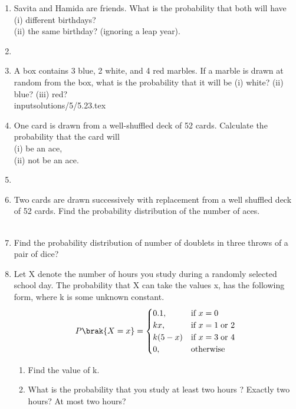 \begin{enumerate}[label=\thesection.\arabic*.,ref=\thesection.\theenumi]
\item Savita and Hamida are friends. What is the probability that both will have \\
(i) different birthdays? \\
(ii) the same birthday? (ignoring a leap year).
%
\solution


\item 
\item  A box contains 3 blue, 2 white, and 4 red marbles. If a marble is drawn
at random from the box, what is the probability that it will be
(i) white? (ii) blue? (iii) red?
\\
\solution 
input{solutions/5/5.23.tex}

\item One card is drawn from a well-shuffled deck of 52 cards. Calculate the
probability that the card will\\
(i) be an ace,\\
(ii) not be an ace.
\\
\solution 

\item 
\item Two cards are drawn successively with replacement from a well shuffled deck of 52 cards. Find the probability distribution of the number of aces.\\
\\
\solution 


\item Find the probability distribution of number of doublets in three throws of a pair of dice?\\
\solution 

\item Let X denote the number of hours you study during a randomly selected school day. The probability that X can take the values x, has the following form, where k is some unknown constant.\\
\begin{align}
    P\brak{X=x} =
    \begin{cases}
      0.1, & \text{if}\ x=0 \\
      kx,  & \text{if}\ x= 1 \; \text{or}\ 2 \\
      k(5-x) & \text{if}\ x= 3 \; \text{or}\ 4 \\
      0, & \text{otherwise}
    \end{cases}
  \end{align}
\begin{enumerate}
\item  Find the value of k.
\item  What is the probability that you study at least two hours ? Exactly two hours? At
most two hours?
\end{enumerate}
\solution



\end{enumerate}
